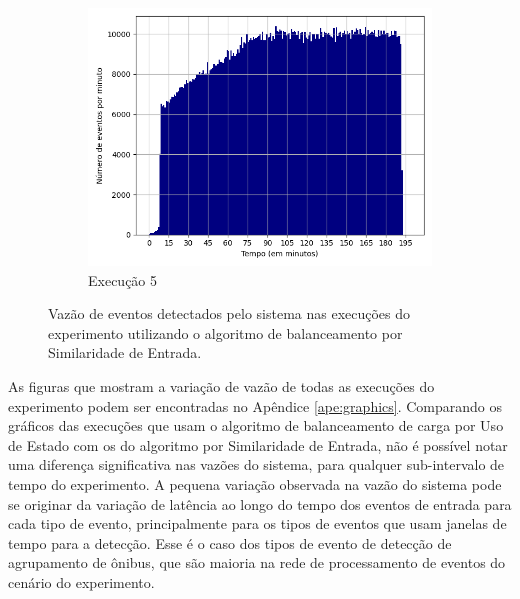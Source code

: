 \begin{figure}[p]
\begin{subfigure}{.5\textwidth}
  \includegraphics[width=\linewidth]{figuras/graphics/histogram_vazao_10-dez-is.png}  
  \caption{Execução 5}
  \label{fig:histv-10-dez-is}
\end{subfigure}
\caption{Vazão de eventos detectados pelo sistema nas execuções do experimento utilizando o algoritmo de balanceamento por Similaridade de Entrada.}
\label{fig:histogram_full_IS}
\end{figure}


As figuras que mostram a variação de vazão de todas as execuções do experimento podem ser encontradas no Apêndice \ref{ape:graphics}. Comparando os gráficos das execuções que usam o algoritmo de balanceamento de carga por Uso de Estado com os do algoritmo por Similaridade de Entrada, não é possível notar uma diferença significativa nas vazões do sistema, para qualquer sub-intervalo de tempo do experimento. A pequena variação observada na vazão do sistema pode se originar da variação de latência ao longo do tempo dos eventos de entrada para cada tipo de evento, principalmente para os tipos de eventos que usam janelas de tempo para a detecção. Esse é o caso dos tipos de evento de detecção de agrupamento de ônibus, que são maioria na rede de processamento de eventos do cenário do experimento.

